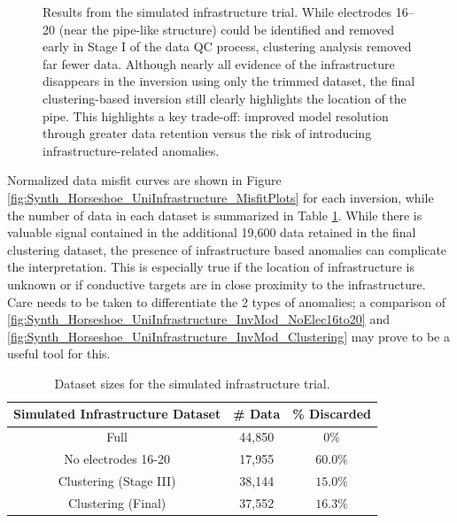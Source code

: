 \documentclass[final,authoryear,5p,times,twocolumn]{elsarticle}
\begin{document}
\begin{figure}[!ht]
   \caption{Results from the simulated infrastructure trial. While electrodes 16--20 (near the pipe-like structure) could be identified and removed early in Stage I of the data QC process, clustering analysis removed far fewer data. Although nearly all evidence of the infrastructure disappears in the inversion using only the trimmed dataset, the final clustering-based inversion still clearly highlights the location of the pipe. This highlights a key trade-off: improved model resolution through greater data retention versus the risk of introducing infrastructure-related anomalies.}
   \label{fig:Synth_Horseshoe_UniInfrastructure}
\end{figure}


Normalized data misfit curves are shown in Figure \ref{fig:Synth_Horseshoe_UniInfrastructure_MisfitPlots} for each inversion, while the number of data in each dataset is summarized in Table \ref{tab:Synth_Infrastructure_Sizes}. While there is valuable signal contained in the additional 19,600 data retained in the final clustering dataset, the presence of infrastructure based anomalies can complicate the interpretation. This is especially true if the location of infrastructure is unknown or if conductive targets are in close proximity to the infrastructure. Care needs to be taken to differentiate the 2 types of anomalies; a comparison of \ref{fig:Synth_Horseshoe_UniInfrastructure_InvMod_NoElec16to20} and \ref{fig:Synth_Horseshoe_UniInfrastructure_InvMod_Clustering} may prove to be a useful tool for this.

\begin{table}[!ht]
\small
\begin{center}
  \begin{tabular}{| c | c | c |}
    \hline
    \bf{Simulated Infrastructure Dataset} & \bf{\# Data} & \bf{\% Discarded} \\
    \hline
    Full &  44,850 & $0 \%$ \\
    \hline
    No electrodes 16-20 & 17,955 & $60.0 \%$ \\
    \hline
    Clustering (Stage III) & 38,144 & $15.0 \%$ \\
    \hline
    Clustering (Final) & 37,552 & $16.3 \%$ \\
    \hline
  \end{tabular}
\caption{Dataset sizes for the simulated infrastructure trial.}
\label{tab:Synth_Infrastructure_Sizes}
\end{center}
\end{table}
\end{document}
